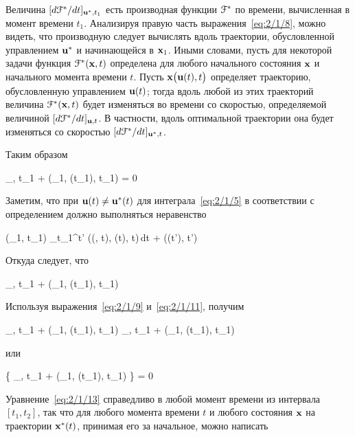 Величина $[ d \mathcal{F}^{*} / d t ]_{{\mathbf{u}^{*}}, t_1}$ есть производная функции $\mathcal{F}^{*}$ по времени, вычисленная в момент времени $t_1$. Анализируя правую часть выражения~\ref{eq:2/1/8}, можно видеть, что производную следует вычислять вдоль траектории, обусловленной управлением ${\mathbf{u}^{*}}$ и начинающейся в $\mathbf{x}_1$. Иными словами, пусть для некоторой задачи функция $\mathcal{F}^{*}(\mathbf{x}, t)$ определена для любого начального состояния $\mathbf{x}$ и начального момента времени $t$. Пусть $\mathbf{x}\bigl( \mathbf{u}(t), t \bigr)$ определяет траекторию, обусловленную управлением $\mathbf{u}(t)$; тогда вдоль любой из этих траекторий величина $\mathcal{F}^{*}(\mathbf{x}, t)$ будет изменяться во времени со скоростью, определяемой величиной $[ d \mathcal{F}^{*} / d t ]_{\mathbf{u}, t}$. В частности, вдоль оптимальной траектории она будет изменяться со скоростью $[ d \mathcal{F}^{*} / d t ]_{{\mathbf{u}^{*}}, t}$.

Таким образом

    _{\optU, t_1} + \funcL\bigl(_1, \optU(t_1), t_1\bigr) = 0 
\eeq

Заметим, что при $\mathbf{u}(t) \neq {   \mathbf{u}  ^{*} }(t)$ для интеграла~\ref{eq:2/1/5} в соответствии с определением должно выполняться неравенство

    \optF(_1, t_1) \leqslant \int\limits_{t_1}^{t'} \funcL\bigl((\optU, t), \optU(t), t\bigr)\,dt + \optF\bigl((t'), t'\bigr) 
\eeq

Откуда следует, что

    _{, t_1} + \funcL\bigl(_1, (t_1), t_1\bigr)  
\eeq

Используя выражения~\vref{eq:2/1/9} и~\ref{eq:2/1/11}, получим

    _{, t_1} + \funcL\bigl(_1, (t_1), t_1\bigr) \geqslant {}_{\optU, t_1} + \funcL\bigl(_1, \optU(t_1), t_1\bigr) \text{,}
\eeq

или

     \biggl\{ _{, t_1} + \funcL\bigl(_1, (t_1), t_1\bigr) \biggr\} = 0 
\eeq

Уравнение~\ref{eq:2/1/13} справедливо в любой момент времени из интервала $[t_1, t_2]$, так что для любого момента времени $t$ и любого состояния $\mathbf{x}$ на траектории ${\mathbf{x}^{*}}(t)$, принимая его за начальное, можно написать

